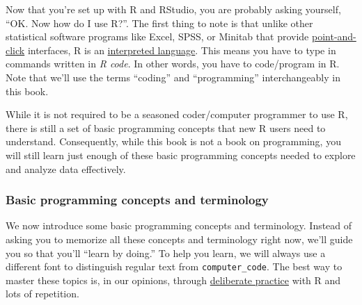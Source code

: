 \documentclass[
]{article}
\begin{document}
Now that you're set up with R and RStudio, you are probably asking
yourself, ``OK. Now how do I use R?''. The first thing to note is that
unlike other statistical software programs like Excel, SPSS, or Minitab
that provide
\href{https://en.wikipedia.org/wiki/Point_and_click}{point-and-click}
interfaces, R is an
\href{https://en.wikipedia.org/wiki/Interpreted_language}{interpreted
language}. This means you have to type in commands written in \emph{R
code}. In other words, you have to code/program in R. Note that we'll
use the terms ``coding'' and ``programming'' interchangeably in this
book.

While it is not required to be a seasoned coder/computer programmer to
use R, there is still a set of basic programming concepts that new R
users need to understand. Consequently, while this book is not a book on
programming, you will still learn just enough of these basic programming
concepts needed to explore and analyze data effectively.

\hypertarget{programming-concepts}{%
\subsubsection{Basic programming concepts and
terminology}\label{programming-concepts}}

We now introduce some basic programming concepts and terminology.
Instead of asking you to memorize all these concepts and terminology
right now, we'll guide you so that you'll ``learn by doing.'' To help
you learn, we will always use a different font to distinguish regular
text from \texttt{computer\_code}. The best way to master these topics
is, in our opinions, through
\href{https://jamesclear.com/deliberate-practice-theory}{deliberate
practice} with R and lots of repetition.
\end{document}
